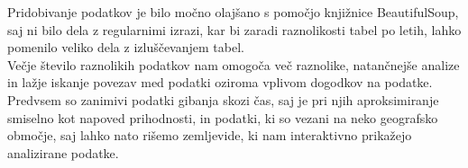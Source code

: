 \documentclass[a4paper, 12pt]{article}
\begin{document}
Pridobivanje podatkov je bilo močno olajšano s pomočjo knjižnice BeautifulSoup, saj ni bilo dela z regularnimi izrazi, kar bi zaradi raznolikosti tabel po letih, lahko pomenilo veliko dela z izluščevanjem tabel.\\
Večje število raznolikih podatkov nam omogoča več raznolike, natančnejše analize in lažje iskanje povezav med podatki oziroma vplivom dogodkov na podatke. Predvsem so zanimivi podatki gibanja skozi čas, saj je pri njih aproksimiranje smiselno kot napoved prihodnosti, in podatki, ki so vezani na neko geografsko območje, saj lahko nato rišemo zemljevide, ki nam interaktivno prikažejo analizirane podatke. \\


\end{document}
